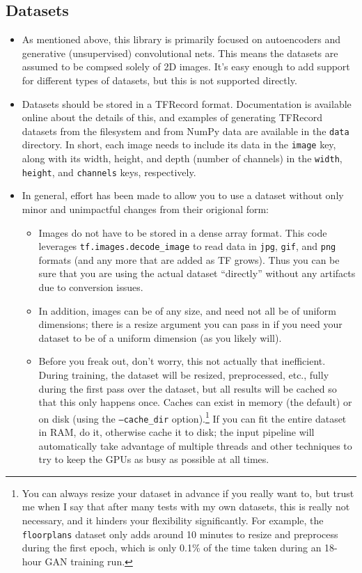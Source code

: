 \documentclass{article}
\begin{document}
\begin{flushleft}
  \section{Datasets}
  \begin{itemize}
  \item As mentioned above, this library is primarily focused on autoencoders and generative (unsupervised) convolutional nets. This means the datasets are assumed to be compsed solely of 2D images. It's easy enough to add support for different types of datasets, but this is not supported directly.
  \item Datasets should be stored in a TFRecord format. Documentation is available online about the details of this, and examples of generating TFRecord datasets from the filesystem and from NumPy data are available in the \texttt{data} directory. In short, each image needs to include its data in the \texttt{image} key, along with its width, height, and depth (number of channels) in the \texttt{width}, \texttt{height}, and \texttt{channels} keys, respectively. 
  \item In general, effort has been made to allow you to use a dataset without only minor and unimpactful changes from their origional form:
    \begin{itemize}
  \item Images do not have to be stored in a dense array format. This code leverages \texttt{tf.images.decode\_image} to read data in \texttt{jpg}, \texttt{gif}, and \texttt{png} formats (and any more that are added as TF grows). Thus you can be sure that you are using the actual dataset ``directly'' without any artifacts due to conversion issues. 
  \item In addition, images can be of any size, and need not all be of uniform dimensions; there is a resize argument you can pass in if you need your dataset to be of a uniform dimension (as you likely will).
  \item Before you freak out, don't worry, this not actually that inefficient. During training, the dataset will be resized, preprocessed, etc., fully during the first pass over the dataset, but all results will be cached so that this only happens once. Caches can exist in memory (the default) or on disk (using the \texttt{--cache\_dir} option).\footnote{You can always resize your dataset in advance if you really want to, but trust me when I say that after many tests with my own datasets, this is really not necessary, and it hinders your flexibility significantly. For example, the \texttt{floorplans} dataset only adds around 10 minutes to resize and preprocess during the first epoch, which is only 0.1\% of the time taken during an 18-hour GAN training run.} If you can fit the entire dataset in RAM, do it, otherwise cache it to disk; the input pipeline will automatically take advantage of multiple threads and other techniques to try to keep the GPUs as busy as possible at all times. 
    \end{itemize}
  \end{itemize}




\end{flushleft}
\end{document}
